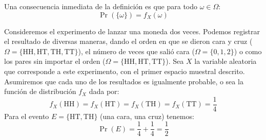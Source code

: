   Una consecuencia inmediata de la definición
  es que para todo \(\omega \in \Omega\):
  \begin{equation*}
    \Pr(\{\omega\})
      = f_X(\omega)
  \end{equation*}

  Consideremos el experimento de lanzar una moneda dos veces.
  Podemos registrar el resultado de diversas maneras,
  dando el orden en que se dieron cara y cruz
  (\(\Omega
      = \{ \mathrm{HH}, \mathrm{HT}, \mathrm{TH}, \mathrm{TT} \}\)),
  el número de veces que salió cara
  (\(\Omega = \{0, 1, 2\}\))
  o como los pares sin importar el orden
  (\(\Omega = \{ \mathrm{HH}, \mathrm{HT}, \mathrm{TT} \}\)).
  Sea \(X\)
  la variable aleatoria que corresponde a este experimento,
  con el primer espacio muestral descrito.
  Asumiremos que cada uno de los resultados es igualmente probable,
  o sea la función de distribución \(f_X\) dada por:
  \begin{equation*}
    f_X(\mathrm{HH})
      = f_X(\mathrm{HT})
      = f_X(\mathrm{TH})
      = f_X(\mathrm{TT})
      = \frac{1}{4}
  \end{equation*}
  Para el evento \(E = \{\mathrm{HT}, \mathrm{TH}\}\)
  (una cara, una cruz)
  tenemos:
  \begin{equation*}
    \Pr(E)
      = \frac{1}{4} + \frac{1}{4}
      = \frac{1}{2}
  \end{equation*}

